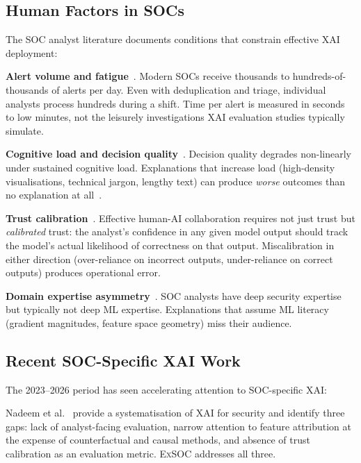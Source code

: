 \documentclass[sigconf,nonacm]{acmart}
\begin{document}
\subsection{Human Factors in SOCs}

The SOC analyst literature documents conditions that constrain effective
XAI deployment:

\textbf{Alert volume and fatigue}~\cite{vielberth2024soc,sundaramurthy2023soc}.
Modern SOCs receive thousands to hundreds-of-thousands of alerts per day.
Even with deduplication and triage, individual analysts process hundreds
during a shift. Time per alert is measured in seconds to low minutes, not
the leisurely investigations XAI evaluation studies typically simulate.

\textbf{Cognitive load and decision quality}~\cite{kuppa2023,zhang2024cognitive}.
Decision quality degrades non-linearly under sustained cognitive load.
Explanations that increase load (high-density visualisations, technical
jargon, lengthy text) can produce \emph{worse} outcomes than no explanation
at all~\cite{schemmer2023ai}.

\textbf{Trust calibration}~\cite{schemmer2023ai,zhang2024cognitive}.
Effective human-AI collaboration requires not just trust but
\emph{calibrated} trust: the analyst's confidence in any given model output
should track the model's actual likelihood of correctness on that output.
Miscalibration in either direction (over-reliance on incorrect outputs,
under-reliance on correct outputs) produces operational error.

\textbf{Domain expertise asymmetry}~\cite{nadeem2023sok}. SOC analysts have
deep security expertise but typically not deep ML expertise. Explanations
that assume ML literacy (gradient magnitudes, feature space geometry) miss
their audience.

\subsection{Recent SOC-Specific XAI Work}

The 2023--2026 period has seen accelerating attention to SOC-specific XAI:

Nadeem et al.~\cite{nadeem2023sok} provide a systematisation of XAI for
security and identify three gaps: lack of analyst-facing evaluation, narrow
attention to feature attribution at the expense of counterfactual and
causal methods, and absence of trust calibration as an evaluation metric.
\textsc{ExSOC} addresses all three.
\end{document}
